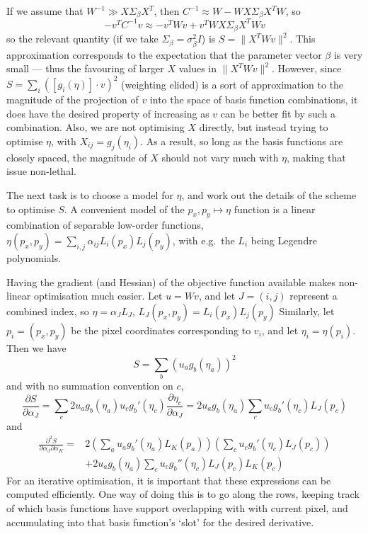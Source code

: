If we assume that $W^{-1} \gg X \Sigma_\beta X^T$, then
$C^{-1} \approx W - W X \Sigma_\beta X^T W$, so
\[
- v^T C^{-1} v \approx  - v^T W v + v^T W X \Sigma_\beta X^T W v
\]
so the relevant quantity (if we take $\Sigma_\beta = \sigma_\beta^2
I$) is $S = \|X^T W v\|^2$. This approximation corresponds to the
expectation that the parameter vector $\beta$ is very small --- thus
the favouring of larger $X$ values in $\| X^T W v\|^2$. However, since
$S = \sum_i ([g_i(\eta)] \cdot v)^2$ (weighting elided) is a sort of
approximation to the magnitude of the projection of $v$ into the space of basis
function combinations, it does have the desired property of increasing
as $v$ can be better fit by such a combination. Also, we are
not optimising $X$ directly, but instead trying to optimise
$\eta$, with $X_{ij} = g_j (\eta_i)$. As a result, so long as the basis
functions are closely spaced, the magnitude of $X$ should not vary much
with $\eta$, making that issue non-lethal.

The next task is to choose a model for $\eta$, and work out the details
of the scheme to optimise $S$. A convenient model of the $p_x, p_y
\mapsto \eta$ function is a linear combination of separable low-order functions,
$\eta(p_x, p_y) = \sum_{i,j} \alpha_{ij}  L_i(p_x) L_j(p_y)$, with e.g.\
the $L_i$ being Legendre polynomials.

Having the gradient (and Hessian) of the objective function available makes non-linear
optimisation much easier. Let $u = W v$, and let $J = (i,j)$ represent a combined index,
so $\eta = \alpha_J L_J$, $L_J(p_x, p_y) = L_i(p_x)L_j(p_y)$
Similarly, let $p_i = (p_x, p_y)$ be the pixel coordinates corresponding to $v_i$,
and let $\eta_i = \eta(p_i)$. Then we have
\[
S = \sum_b (u_a g_b (\eta_a))^2
\]
and with no summation convention on $c$, 
\[
\frac{\partial S}{\partial \alpha_J} = \sum_c 2 u_a g_b (\eta_a) u_c g_b' (\eta_c) \frac{
\partial \eta_c}{\partial \alpha_J}
= 2 u_a g_b (\eta_a) \sum_c u_c g_b'(\eta_c) L_J(p_c)
\]
and
\begin{align*}
\frac{\partial^2 S}{\partial \alpha_J \partial \alpha_K} = & 2
\left(\sum_a u_a g_b'(\eta_a) L_K (p_a)\right)
\left(\sum_c u_c g_b'(\eta_c) L_J (p_c)\right)
\\
 &+ 2 u_a g_b (\eta_a)
\sum_c u_c g_b''(\eta_c) L_J(p_c) L_K(p_c)
\end{align*}
%
For an iterative optimisation, it is important that these expressions
can be computed efficiently. One way of doing this is to go along the
rows, keeping track of which basis functions have support overlapping
with with current pixel, and accumulating into that basis function's
`slot' for the desired derivative.
